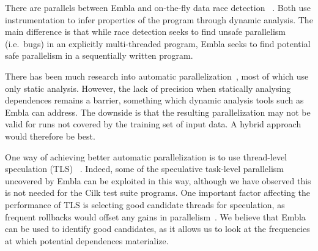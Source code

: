 There are parallels between Embla and on-the-fly data race detection~
\cite{MellorCrummey91onthefly,savage97eraser}.  Both use
instrumentation to infer properties of the program through dynamic
analysis.  The main difference is that while race detection seeks to
find unsafe parallelism (i.e.\ bugs) in an explicitly multi-threaded
program, Embla seeks to find potential safe parallelism in a
sequentially written program.

There has been much research into automatic parallelization~\cite{kennedy02optimizing,Blume94polaris},
most of which use only static analysis.  However,
the lack of precision when statically analysing dependences remains a
barrier, something which dynamic analysis tools such as Embla can address.
The downside is that the resulting parallelization may not be valid
for runs not covered by the training set of input data.
A hybrid approach would therefore be best.

One way of achieving better automatic parallelization is to use
thread-level speculation (TLS)~
\cite{Rundberg01anall-software,gregory05stampede}.
Indeed, some of the speculative
task-level parallelism uncovered by Embla can be exploited in
this way, 
although we have observed this is not needed for the Cilk test suite programs.
One important factor affecting the performance of TLS is
selecting good candidate threads for speculation, as frequent
rollbacks would offset any gains in parallelism~\cite{johnson04mincut,liu06posh}.
We believe that Embla can be used to identify good
candidates, as it allows us to look at the frequencies at which
potential dependences materialize.
